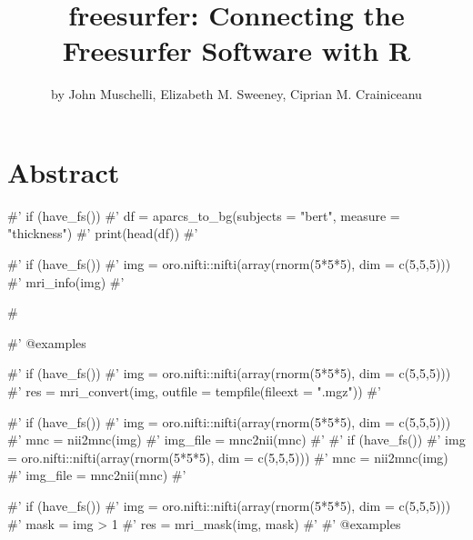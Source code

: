 \title{freesurfer: Connecting the Freesurfer Software with R}
\author{by John Muschelli, Elizabeth M. Sweeney, Ciprian M. Crainiceanu}

\maketitle


\section{Abstract}\label{abstract}

\begin{Schunk}
\begin{Sinput}
#' if (have_fs()) {
#'    df = aparcs_to_bg(subjects = "bert", measure = "thickness")
#'    print(head(df))
#' }
\end{Sinput}
\end{Schunk}

\begin{Schunk}
\begin{Sinput}
#' if (have_fs()){
#'    img = oro.nifti::nifti(array(rnorm(5*5*5), dim = c(5,5,5)))  
#'    mri_info(img)
#' }


#   

#' @examples 

  #' if (have_fs()) {
#'    img = oro.nifti::nifti(array(rnorm(5*5*5), dim = c(5,5,5))) 
#'    res = mri_convert(img, outfile = tempfile(fileext = ".mgz"))
#' } 

  #' if (have_fs()) {
#'    img = oro.nifti::nifti(array(rnorm(5*5*5), dim = c(5,5,5)))  
#'    mnc = nii2mnc(img)
#'    img_file = mnc2nii(mnc)
#' }
#' if (have_fs()) {
#'    img = oro.nifti::nifti(array(rnorm(5*5*5), dim = c(5,5,5)))  
#'    mnc = nii2mnc(img)
#'    img_file = mnc2nii(mnc)
#' }

  #' if (have_fs()) {
#'    img = oro.nifti::nifti(array(rnorm(5*5*5), dim = c(5,5,5)))  
#'    mask = img > 1
#'    res = mri_mask(img, mask)
#' }
#' @examples  
\end{Sinput}
\end{Schunk}

